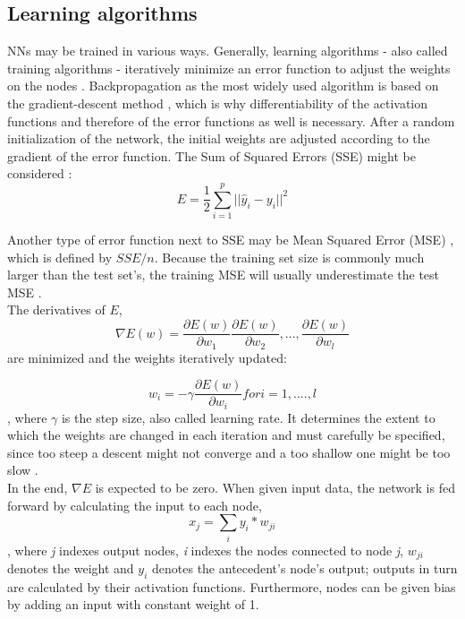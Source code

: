 \documentclass[a4paper, 11pt]{article}
\begin{document}
\subsection{Learning algorithms}

NNs may be trained in various ways. Generally, learning algorithms - also called training algorithms - iteratively minimize an error function to adjust the weights on the nodes \citep{Nakamura.2005}. Backpropagation as the most widely used algorithm is based on the gradient-descent method \citep{Rojas.1996}, which is why differentiability of the activation functions and therefore of the error functions as well is necessary. After a random initialization of the network, the initial weights are adjusted according to the gradient of the error function. The Sum of Squared Errors (SSE) might be considered \citep{Rojas.1996}:
\begin{equation} E = \frac{1}{2}\sum_{i=1}^{p}||\hat{y}_{i} - y_{i}||^{2}\end{equation}

Another type of error function next to SSE may be Mean Squared Error (MSE) \citep{Zhang.1998}, which is defined by $ SSE/n$. Because the training set size is commonly much larger than the test set's, the training MSE will usually underestimate the test MSE \citep{James.2013}. \\
The derivatives of $E$, 
\begin{equation}
\nabla E(w) = {\frac{\partial E(w)}{\partial w_{1}}\frac{\partial E(w)}{\partial w_{2}},...,\frac{\partial E(w)}{\partial w_{l}}}
\end{equation}
 are minimized and the weights iteratively updated:

\begin{equation}
w_{i} = -\gamma\frac{\partial E(w)}{\partial w_{i}} for \textit{i} = 1, ...., \textit{l}
\end{equation}
, where $\gamma$ is the step size, also called learning rate. It determines the extent to which the weights are changed in each iteration and must carefully be specified, since too steep a descent might not converge and a too shallow one might be too slow \citep{Zhang.1998}.\\
In the end, $\nabla E$ is expected to be zero. 
When given input data, the network is fed forward by calculating the input to each node,
\begin{equation}
x_j = \sum_{i}y_{i}*w_{ji}
\end{equation}, where \textit{j} indexes output nodes, \textit{i} indexes the nodes connected to node \textit{j}, $w_{ji}$ denotes the weight and $y_{i}$ denotes the antecedent's node's output; outputs in turn are calculated by their activation functions. Furthermore, nodes can be given bias by adding an input with constant weight of 1\citep{Rumelhart.1986}.\\
\end{document}
